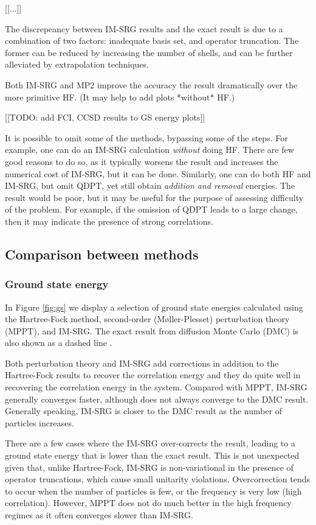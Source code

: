 [[...]]


The discrepeancy between IM-SRG results and the exact result is due to a combination of two factors: inadequate basis set, and operator truncation.
The former can be reduced by increasing the number of shells, and can be further alleviated by extrapolation techniques.

Both IM-SRG and MP2 improve the accuracy the result dramatically over the more primitive HF.  (It may help to add plots *without* HF.)

[[TODO: add FCI, CCSD results to GS energy plots]]

It is possible to omit some of the methods, bypassing some of the steps.  For example, one can do an IM-SRG calculation \emph{without} doing HF.  There are few good reasons to do so, as it typically worsens the result and increases the numerical cost of IM-SRG, but it can be done.  Similarly, one can do both HF and IM-SRG, but omit QDPT, yet still obtain \emph{addition and removal} energies.  The result would be poor, but it may be useful for the purpose of assessing difficulty of the problem.  For example, if the omission of QDPT leads to a large change, then it may indicate the presence of strong correlations.

\subsection{Comparison between methods}

\subsubsection{Ground state energy}

In Figure \ref{fig:gs} we display a selection of ground state energies calculated using the Hartree-Fock method, second-order (M\o ller-Plesset) perturbation theory (MPPT), and IM-SRG.  The exact result from diffusion Monte Carlo (DMC) is also shown as a dashed line \cite{PhysRevB.84.115302}.

Both perturbation theory and IM-SRG add corrections in addition to the Hartree-Fock results to recover the correlation energy and they do quite well in recovering the correlation energy in the system.  Compared with MPPT, IM-SRG generally converges faster, although does not always converge to the DMC result.  Generally speaking, IM-SRG is closer to the DMC result as the number of particles increases.

There are a few cases where the IM-SRG over-corrects the result, leading to a ground state energy that is lower than the exact result.  This is not unexpected given that, unlike Hartree-Fock, IM-SRG is non-variational in the presence of operator truncations, which cause small unitarity violations.  Overcorrection tends to occur when the number of particles is few, or the frequency is very low (high correlation).  However, MPPT does not do much better in the high frequency regimes as it often converges slower than IM-SRG.

